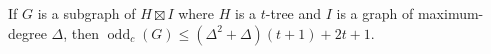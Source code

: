 \documentclass{patmorin}
\DeclareMathOperator{\odd}{odd}
\newcommand{\oddc}{\odd_c}
\begin{document}
\begin{thm}\label{product_structure_result_delta}
  If $G$ is a subgraph of $H\boxtimes I$ where $H$ is a $t$-tree and $I$ is a graph of maximum-degree $\Delta$, then $\oddc(G)\le(\Delta^2+\Delta)(t+1)+2t+1$.
\end{thm}



%
%
%



\end{document}
